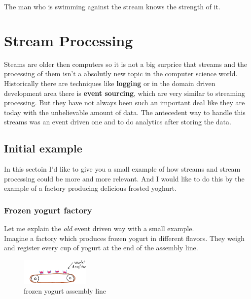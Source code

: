 \begin{savequote}[75mm]
The man who is swimming against the stream knows the strength of it.
\end{savequote}

\chapter{Stream Processing}
Steams are older then computers so it is not a big surprice that streams
and the processing of them isn't a absolutly new topic in the computer science world.
Historically there are techniques like \textbf{logging} or in the domain driven development area there is \textbf{event sourcing},
which are very similar to streaming processing.
But they have not always been such an important deal like they are today with the unbelievable amount of data.
The antecedent way to handle this streams was an event driven one and to do analytics after storing the data.\\

\newpage

\section{Initial example}
In this sectoin I'd like to give you a small example of how streams and stream processing could be more and more
relevant. And I would like to do this by the example of a factory producing delicious frosted yoghurt.

\subsection{Frozen yogurt factory}
Let me explain the \textit{old} event driven way with a small example.\\
Imagine a factory which produces frozen yogurt in different flavors.
They weigh and register every cup of yogurt at the end of the assembly line.\\

\begin{figure}[H]
\centering
\captionsetup{justification=centering}
\includegraphics[width=0.3\textwidth]{images/cups.png}
\caption[Frozen yogurt assembly line]{frozen yogurt assembly line}
\end{figure}

